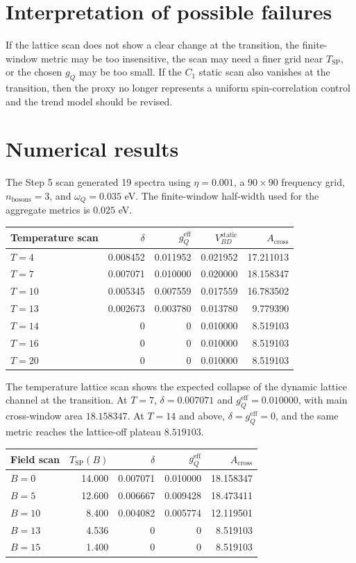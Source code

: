 \documentclass[11pt]{article}
\begin{document}
\section{Interpretation of possible failures}
If the lattice scan does not show a clear change at the transition, the
finite-window metric may be too insensitive, the scan may need a finer grid near
$T_{\mathrm{SP}}$, or the chosen $g_Q$ may be too small.  If the $C_1$ static
scan also vanishes at the transition, then the proxy no longer represents a
uniform spin-correlation control and the trend model should be revised.

\section{Numerical results}
The Step 5 scan generated 19 spectra using $\eta=0.001$, a $90\times90$
frequency grid, $n_{\mathrm{bosons}}=3$, and $\omega_Q=0.035$ eV.  The
finite-window half-width used for the aggregate metrics is $0.025$ eV.

\begin{center}
\begin{tabular}{lrrrr}
\toprule
Temperature scan & $\delta$ & $g_Q^{\mathrm{eff}}$ &
$V_{BD}^{\mathrm{static}}$ & $A_{\mathrm{cross}}$ \\
\midrule
$T=4$ & 0.008452 & 0.011952 & 0.021952 & 17.211013 \\
$T=7$ & 0.007071 & 0.010000 & 0.020000 & 18.158347 \\
$T=10$ & 0.005345 & 0.007559 & 0.017559 & 16.783502 \\
$T=13$ & 0.002673 & 0.003780 & 0.013780 & 9.779390 \\
$T=14$ & 0 & 0 & 0.010000 & 8.519103 \\
$T=16$ & 0 & 0 & 0.010000 & 8.519103 \\
$T=20$ & 0 & 0 & 0.010000 & 8.519103 \\
\bottomrule
\end{tabular}
\end{center}

The temperature lattice scan shows the expected collapse of the dynamic lattice
channel at the transition.  At $T=7$, $\delta=0.007071$ and
$g_Q^{\mathrm{eff}}=0.010000$, with main cross-window area $18.158347$.  At
$T=14$ and above, $\delta=g_Q^{\mathrm{eff}}=0$, and the same metric reaches
the lattice-off plateau $8.519103$.

\begin{center}
\begin{tabular}{lrrrr}
\toprule
Field scan & $T_{\mathrm{SP}}(B)$ & $\delta$ &
$g_Q^{\mathrm{eff}}$ & $A_{\mathrm{cross}}$ \\
\midrule
$B=0$ & 14.000 & 0.007071 & 0.010000 & 18.158347 \\
$B=5$ & 12.600 & 0.006667 & 0.009428 & 18.473411 \\
$B=10$ & 8.400 & 0.004082 & 0.005774 & 12.119501 \\
$B=13$ & 4.536 & 0 & 0 & 8.519103 \\
$B=15$ & 1.400 & 0 & 0 & 8.519103 \\
\bottomrule
\end{tabular}
\end{center}
\end{document}

